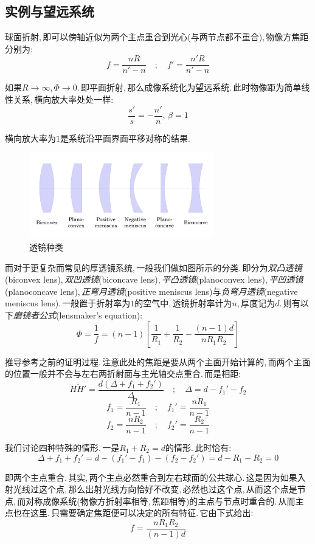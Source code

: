 \subsection{实例与望远系统}
球面折射,\,即可以傍轴近似为两个主点重合到光心(与两节点都不重合),\,物像方焦距分别为:
\[f=\frac{nR}{n'-n}\quad;\quad f'=\frac{n'R}{n'-n}\]

如果\(R\to \infty\),\,\(\varPhi\to 0\).\,即平面折射,\,那么成像系统化为望远系统.\,此时物像距为简单线性关系,\,横向放大率处处一样:
\[\frac{s'}{s}=-\frac{n'}{n},\,\beta=1\]

横向放大率为\(1\)是系统沿平面界面平移对称的结果.

\begin{figure}
\centering
\vspace{0cm}
\includegraphics[width=8cm]{image/5-7-11.png}
\caption{透镜种类}
\end{figure}
而对于更复杂而常见的厚透镜系统,\,一般我们做如图所示的分类.\,即分为\emph{双凸透镜}(biconvex lens),\,\emph{双凹透镜}(biconcave lens),\,\emph{平凸透镜}(planoconvex lens),\,\emph{平凹透镜}(planoconcave lens),\,\emph{正弯月透镜}(positive meniscus lens)与\emph{负弯月透镜}(negative meniscus lens).\,一般置于折射率为\(1\)的空气中,\,透镜折射率计为\(n\),\,厚度记为\(d\).\,则有以下\emph{磨镜者公式}(lensmaker's equation):
\[\varPhi=\frac{1}{f}=(n-1)[\frac{1}{R_1}+\frac{1}{R_2}-\frac{(n-1)d}{nR_1R_2}]\]

推导参考之前的证明过程.\,注意此处的焦距是要从两个主面开始计算的,\,而两个主面的位置一般并不会与左右两折射面与主光轴交点重合.\,而是相距:
\[\overline{HH'}=\frac{d(\varDelta+f_1+f_2')}{\varDelta}\quad;\quad \varDelta=d-f_1'-f_2\]
\[f_1=\frac{R_1}{n-1}\quad ;\quad f_1'=\frac{nR_1}{n-1}\]
\[f_2=\frac{nR_2}{n-1}\quad ;\quad f_2'=\frac{R_2}{n-1}\]

我们讨论四种特殊的情形.\,一是\(R_1+R_2=d\)的情形.\,此时恰有:
\[\varDelta+f_1+f_2'=d-(f_1'-f_1)-(f_2-f_2')=d-R_1-R_2=0\]

即两个主点重合.\,其实,\,两个主点必然重合到左右球面的公共球心.\,这是因为如果入射光线过这个点,\,那么出射光线方向恰好不改变,\,必然也过这个点,\,从而这个点是节点,\,而对称成像系统(物像方折射率相等,\,焦距相等)的主点与节点时重合的.\,从而主点也在这里.\,只需要确定焦距便可以决定的所有特征.\,它由下式给出:
\[f=\frac{nR_1R_2}{(n-1)d}\]

